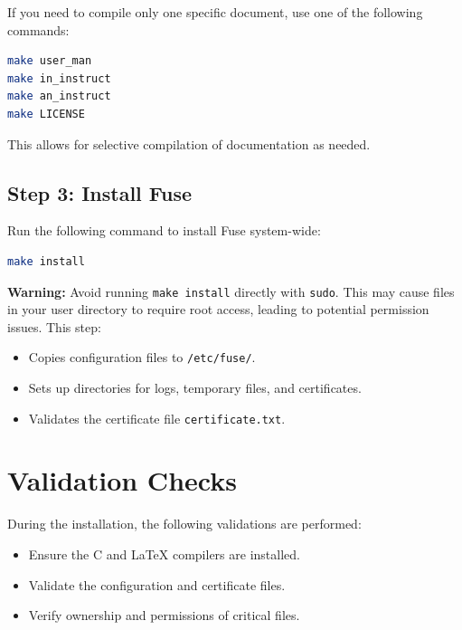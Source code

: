 \documentclass[a4paper,12pt]{article}
\begin{document}
\newpage

If you need to compile only one specific document, use one of the following commands:
\begin{lstlisting}[language=bash]
make user_man
make in_instruct
make an_instruct
make LICENSE
\end{lstlisting}
This allows for selective compilation of documentation as needed.

\subsection*{Step 3: Install Fuse}
Run the following command to install Fuse system-wide:
\begin{lstlisting}[language=bash]
make install
\end{lstlisting}
\textbf{Warning:} Avoid running \texttt{make install} directly with \texttt{sudo}. This may cause files in your user directory to require root access, leading to potential permission issues.
\newline
This step:
\begin{itemize}
	\item Copies configuration files to \texttt{/etc/fuse/}.
	\item Sets up directories for logs, temporary files, and certificates.
	\item Validates the certificate file \texttt{certificate.txt}.
\end{itemize}

\section*{Validation Checks}
During the installation, the following validations are performed:
\begin{itemize}
	\item Ensure the C and LaTeX compilers are installed.
	\item Validate the configuration and certificate files.
	\item Verify ownership and permissions of critical files.
\end{itemize}

\newpage
\end{document}
